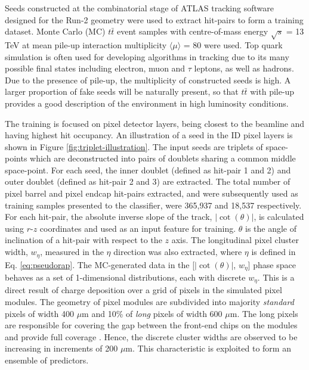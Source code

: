 Seeds constructed at the combinatorial stage of ATLAS tracking software designed for the Run-2 geometry were used to extract hit-pairs to form a training dataset. Monte Carlo (MC) $t\bar{t}$ event samples with centre-of-mass energy $\sqrt{s}$ = 13 TeV at mean pile-up interaction multiplicity $\langle \mu \rangle$ = 80 were used. Top quark simulation is often used for developing algorithms in tracking due to its many possible final states including electron, muon and $\tau$ leptons, as well as hadrons. Due to the presence of pile-up, the multiplicity of constructed seeds is high. A larger proportion of fake seeds will be naturally present, so that $t\bar{t}$ with pile-up provides a good description of the environment in high luminosity conditions.

The training is focused on pixel detector layers, being closest to the beamline and having highest hit occupancy. An illustration of a seed in the ID pixel layers is shown in Figure \ref{fig:triplet-illustration}. The input seeds are triplets of space-points which are deconstructed into pairs of doublets sharing a common middle space-point. For each seed, the inner doublet (defined as hit-pair 1 and 2) and outer doublet (defined as hit-pair 2 and 3) are extracted. The total number of pixel barrel and pixel endcap hit-pairs extracted, and were subsequently used as training samples presented to the classifier, were 365,937 and 18,537 respectively. For each hit-pair, the absolute inverse slope of the track, $|\cot(\theta)|$, is calculated using $r$-$z$ coordinates and used as an input feature for training. $\theta$ is the angle of inclination of a hit-pair with respect to the $z$ axis. The longitudinal pixel cluster width, $w_{\eta}$, measured in the $\eta$ direction was also extracted, where $\eta$ is defined in Eq. \ref{eq:pseudorap}. The MC-generated data in the [$|\cot(\theta)|$, $w_{\eta}$] phase space behaves as a set of 1-dimensional distributions, each with discrete $w_{\eta}$. This is a direct result of charge deposition over a grid of pixels in the simulated pixel modules. The geometry of pixel modules are subdivided into majority \textit{standard} pixels of width 400 $\mu$m and 10\% of \textit{long} pixels of width 600 $\mu$m. The long pixels are responsible for covering the gap between the front-end chips on the modules and provide full coverage \cite{pixel-module-dimensions}. Hence, the discrete cluster widths are observed to be increasing in increments of 200 $\mu$m. This characteristic is exploited to form an ensemble of predictors. 

